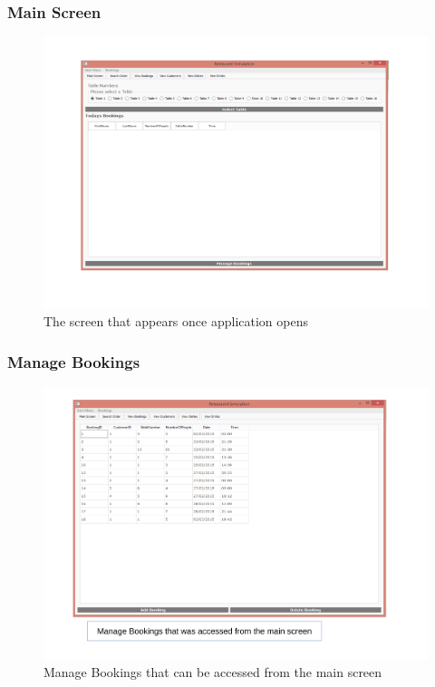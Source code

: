 \begin{landscape}

\subsubsection{Main Screen}

\begin{figure}[H]
    \includegraphics[width=15cm]{./Maintenance/images/screen1}
    \caption{The screen that appears once application opens} \label{fig:screen1}
\end{figure}

\subsubsection{Manage Bookings}
\begin{figure}[H]
    \includegraphics[width = 15cm]{./Maintenance/images/screen2}
    \caption{Manage Bookings that can be accessed from the main screen} \label{fig:screen2}
\end{figure}


\end{landscape}
